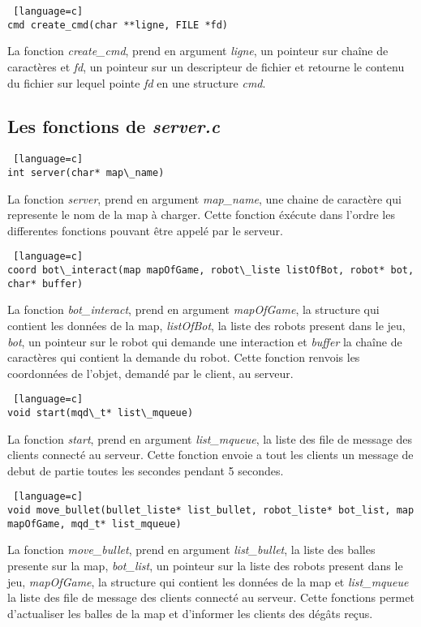 \documentclass[a4paper, 11pt]{article}
\begin{document}
\begin {lstlisting} [language=c]
cmd create_cmd(char **ligne, FILE *fd)
\end{lstlisting}
La fonction \emph{create\_cmd}, prend en argument \emph{ligne}, un pointeur sur chaîne de caractères et \emph{fd}, un pointeur sur un descripteur de fichier et retourne le contenu du fichier sur lequel pointe \emph{fd} en une structure \emph{cmd}.\\

\newpage
\subsection{Les fonctions de \emph{server.c}}
\begin {lstlisting} [language=c]
int server(char* map\_name)
\end{lstlisting}
La fonction \emph{server}, prend en argument \emph{map\_name}, une chaine de caractère qui represente le nom de la map à charger. Cette
fonction éxécute dans l'ordre les differentes fonctions pouvant être appelé par le serveur.\\

\begin {lstlisting} [language=c]
coord bot\_interact(map mapOfGame, robot\_liste listOfBot, robot* bot, char* buffer)
\end{lstlisting}
La fonction \emph{bot\_interact}, prend en argument \emph{mapOfGame}, la structure qui contient les données de la map, \emph{listOfBot}, la liste des robots present dans le jeu, \emph{bot}, un pointeur sur le robot qui demande une interaction et \emph{buffer} la chaîne de caractères qui contient la demande du robot. Cette fonction renvois les coordonnées de l'objet, demandé par le client, au serveur.\\

\begin {lstlisting} [language=c]
void start(mqd\_t* list\_mqueue)
\end{lstlisting}
La fonction \emph{start}, prend en argument \emph{list\_mqueue}, la liste des file de message des clients connecté au serveur. Cette fonction envoie a tout les clients un message de debut de partie toutes les secondes pendant 5 secondes.\\

\begin {lstlisting} [language=c]
void move_bullet(bullet_liste* list_bullet, robot_liste* bot_list, map mapOfGame, mqd_t* list_mqueue)
\end{lstlisting}
La fonction \emph{move\_bullet}, prend en argument \emph{list\_bullet}, la liste des balles presente sur la map, \emph{bot\_list}, un pointeur sur la liste des robots present dans le jeu, \emph{mapOfGame}, la structure qui contient les données de la map et \emph{list\_mqueue} la liste des file de message des clients connecté au serveur. Cette fonctions permet d'actualiser les balles de la map et d'informer les clients des dégâts reçus.\\
\end{document}
